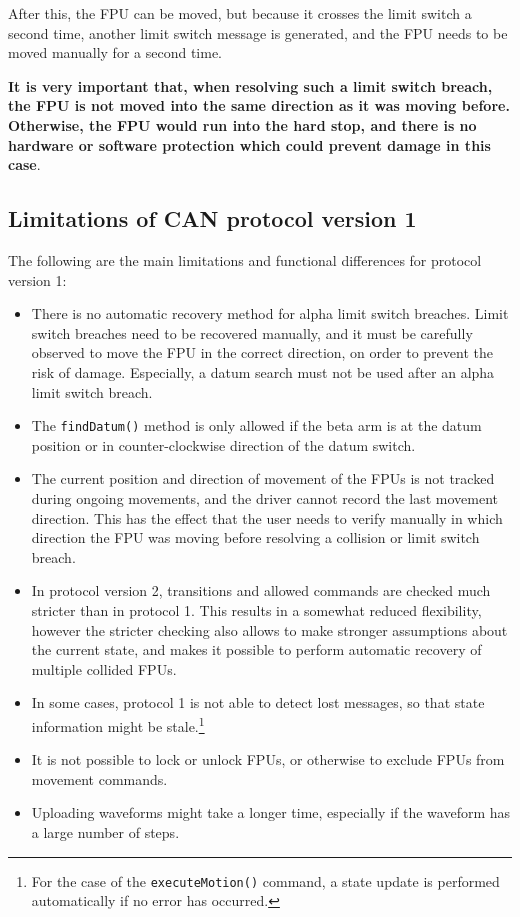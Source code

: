 \documentclass{scrartcl}[12pt,a4paper]
\begin{document}
After this, the FPU can be moved, but because it crosses
the limit switch a second time, another limit switch
message is generated, and the FPU needs to be moved
manually for a second time.

\textbf{It is very important that, when resolving such a limit switch
  breach, the FPU is not moved into the same direction as it was
  moving before.  Otherwise, the FPU would run into the hard stop, and
  there is no hardware or software protection which could prevent
  damage in this case}.


\subsection{Limitations of CAN protocol version 1}

The following are the main limitations and functional
differences for protocol version 1:

\begin{itemize}
\item There is no automatic recovery method for alpha
  limit switch breaches. Limit switch breaches need
  to be recovered manually, and it must be carefully
  observed to move the FPU in the correct direction,
  on order to prevent the risk of damage. Especially,
  a datum search must not be used after an alpha limit switch
  breach.

\item The \texttt{findDatum()} method is only allowed if the beta arm
  is at the datum position or in counter-clockwise direction of the
  datum switch.

\item The current position and direction of movement of the FPUs is
  not tracked during ongoing movements, and the driver cannot record
  the last movement direction. This has the effect that the user needs
  to verify manually in which direction the FPU was moving before
  resolving a collision or limit switch breach.

\item In protocol version 2, transitions and allowed commands are
  checked much stricter than in protocol 1.  This results in a
  somewhat reduced flexibility, however the stricter checking also
  allows to make stronger assumptions about the current state, and
  makes it possible to perform automatic recovery of multiple collided
  FPUs.
  
\item In some cases, protocol 1 is not able to
  detect lost messages, so that state information
  might be stale.\footnote{For the case of the \texttt{executeMotion()}
  command, a state update is performed automatically
  if no error has occurred.}

\item It is not possible to lock or unlock FPUs, or otherwise to
  exclude FPUs from movement commands.
  
\item Uploading waveforms might take a longer time, especially if the
  waveform has a large number of steps.
  
\end{itemize}
\end{document}
